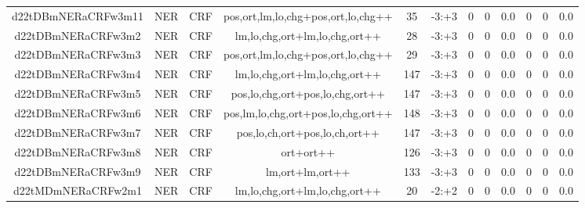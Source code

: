 \documentclass[a4paper]{article}
\begin{document}
\begin{landscape}
\begin{center}
\begin{tabular}{ |c|c|c|c|c|c|c|c|c|c|c|c|}
 
 	
 	\small{ d22tDBmNERaCRFw3m11 } & \small{ NER} & \small{  CRF }  & pos,ort,lm,lo,chg+pos,ort,lo,chg++  &  35 &  \small{  -3:+3 }  &  0 & 0 & 0.0  &  0 & 0 & 0.0 \\
 	

 
 	
 	\small{ d22tDBmNERaCRFw3m2 } & \small{ NER} & \small{  CRF }  & lm,lo,chg,ort+lm,lo,chg,ort++  &  28 &  \small{  -3:+3 }  &  0 & 0 & 0.0  &  0 & 0 & 0.0 \\
 	

 
 	
 	\small{ d22tDBmNERaCRFw3m3 } & \small{ NER} & \small{  CRF }  & pos,ort,lm,lo,chg+pos,ort,lo,chg++  &  29 &  \small{  -3:+3 }  &  0 & 0 & 0.0  &  0 & 0 & 0.0 \\
 	

 
 	
 	\small{ d22tDBmNERaCRFw3m4 } & \small{ NER} & \small{  CRF }  & lm,lo,chg,ort+lm,lo,chg,ort++  &  147 &  \small{  -3:+3 }  &  0 & 0 & 0.0  &  0 & 0 & 0.0 \\
 	

 
 	
 	\small{ d22tDBmNERaCRFw3m5 } & \small{ NER} & \small{  CRF }  & pos,lo,chg,ort+pos,lo,chg,ort++  &  147 &  \small{  -3:+3 }  &  0 & 0 & 0.0  &  0 & 0 & 0.0 \\
 	

 
 	
 	\small{ d22tDBmNERaCRFw3m6 } & \small{ NER} & \small{  CRF }  & pos,lm,lo,chg,ort+pos,lo,chg,ort++  &  148 &  \small{  -3:+3 }  &  0 & 0 & 0.0  &  0 & 0 & 0.0 \\
 	

 
 	
 	\small{ d22tDBmNERaCRFw3m7 } & \small{ NER} & \small{  CRF }  & pos,lo,ch,ort+pos,lo,ch,ort++  &  147 &  \small{  -3:+3 }  &  0 & 0 & 0.0  &  0 & 0 & 0.0 \\
 	

 
 	
 	\small{ d22tDBmNERaCRFw3m8 } & \small{ NER} & \small{  CRF }  & ort+ort++  &  126 &  \small{  -3:+3 }  &  0 & 0 & 0.0  &  0 & 0 & 0.0 \\
 	

 
 	
 	\small{ d22tDBmNERaCRFw3m9 } & \small{ NER} & \small{  CRF }  & lm,ort+lm,ort++  &  133 &  \small{  -3:+3 }  &  0 & 0 & 0.0  &  0 & 0 & 0.0 \\
 	

 
 	
 	\small{ d22tMDmNERaCRFw2m1 } & \small{ NER} & \small{  CRF }  & lm,lo,chg,ort+lm,lo,chg,ort++  &  20 &  \small{  -2:+2 }  &  0 & 0 & 0.0  &  0 & 0 & 0.0 \\
 	


\end{tabular}
\end{center}
\end{landscape}
\end{document}
